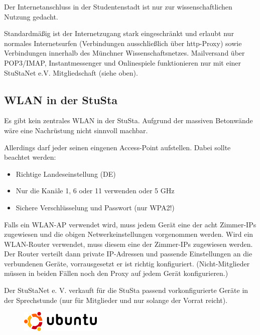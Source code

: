 \documentclass[a4paper,12pt]{scrartcl}
\begin{document}
Der Internetanschluss in der Studentenstadt ist nur zur wissenschaftlichen Nutzung gedacht.

Standardmäßig ist der Internetzugang stark eingeschränkt und erlaubt nur normales Internetsurfen (Verbindungen ausschließlich über http-Proxy) sowie Verbindungen innerhalb des Münchner Wissenschaftsnetzes. Mailversand über POP3/IMAP, Instantmessenger und Onlinespiele funktionieren nur mit einer StuStaNet e.V. Mitgliedschaft (siehe oben).


\subsection*{WLAN in der StuSta}
Es gibt kein zentrales WLAN in der StuSta. Aufgrund der massiven Betonwände wäre eine Nachrüstung nicht sinnvoll machbar.

Allerdings darf jeder seinen eingenen Access-Point aufstellen. Dabei sollte beachtet werden:
\begin{itemize}
    \item Richtige Landeseinstellung (DE)
    \item Nur die Kanäle 1, 6 oder 11 verwenden oder 5 GHz
    \item Sichere Verschlüsselung und Passwort (nur WPA2!)
\end{itemize}

Falls ein WLAN-AP verwendet wird, muss jedem Gerät eine der acht Zimmer-IPs zugewiesen und die obigen Netwerkeinstellungen vorgenommen werden. Wird ein WLAN-Router verwendet, muss diesem eine der Zimmer-IPs zugewiesen werden. Der Router verteilt dann private IP-Adressen und passende Einstellungen an die verbundenen Geräte, vorrausgesetzt er ist richtig konfiguriert. (Nicht-Mitglieder müssen in beiden Fällen noch den Proxy auf jedem Gerät konfigurieren.)

\vspace{2em}

Der StuStaNet e. V. verkauft für die StuSta passend vorkonfigurierte Geräte in der Sprechstunde (nur für Mitglieder und nur solange der Vorrat reicht).


\newpage
\enlargethispage{20pt}

\begin{figure}[t!]
    \raggedleft
    \vspace{-20pt}
    \includegraphics[height=1cm,keepaspectratio]{Bilder/Ubuntu_logo}
    \vspace{-30pt}
\end{figure}
\end{document}
